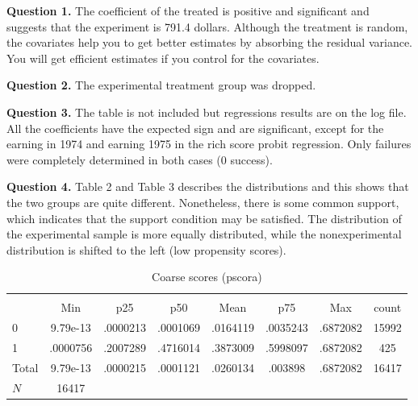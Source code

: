 \documentclass{article}
\theoremstyle{definition}
\begin{document}
\hspace{0.41cm} \textbf{Question 1.} The coefficient of the treated is positive and significant and suggests that the experiment is 791.4 dollars. Although the treatment is random,  the covariates help you to get better estimates by absorbing the residual variance. You will get efficient estimates if you control for the covariates. 



\hspace{0.41cm} \textbf{Question 2.} The experimental treatment group was dropped. 

\hspace{0.41cm} \textbf{Question 3.} The table is not included but regressions results are on the log file. All the coefficients have the expected sign and are significant, except for the earning in 1974 and earning 1975 in the rich score probit regression. Only failures were completely determined in both cases (0 success).

\hspace{0.41cm} \textbf{Question 4.} Table 2 and Table 3 describes the distributions and this shows that the two groups are quite different.  Nonetheless, there is some common support, which indicates that the support condition may be satisfied. The distribution of the experimental sample is more equally distributed, while the nonexperimental distribution is shifted to the left (low propensity scores).


\begin{table}[htbp]\centering
\def\sym#1{\ifmmode^{#1}\else\(^{#1}\)\fi}
\caption{Coarse scores (pscora)}
\begin{tabular}{l*{1}{ccccccc}}
\hline\hline
          &\multicolumn{7}{c}{}                                                 \\
          &      Min&      p25&      p50&     Mean&      p75&      Max&    count\\
\hline
0         & 9.79e-13& .0000213& .0001069& .0164119& .0035243& .6872082&    15992\\
1         & .0000756& .2007289& .4716014& .3873009& .5998097& .6872082&      425\\
Total     & 9.79e-13& .0000215& .0001121& .0260134&  .003898& .6872082&    16417\\
\hline
\(N\)     &    16417&         &         &         &         &         &         \\
\hline\hline
\end{tabular}
\end{table}
\end{document}
